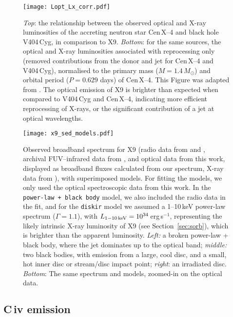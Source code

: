 \documentclass[a4paper,fleqn,usenatbib]{mnras}
\begin{document}
\begin{figure}
	\texttt{[image: Lopt\_Lx\_corr.pdf]}
	\caption{{\it Top}: the relationship between the observed optical and X-ray luminosities of the accreting neutron star Cen\,X--4 and black hole V404\,Cyg, in comparison to X9. {\it Bottom}: for the same sources, the optical and X-ray luminosities associated with reprocessing only (removed contributions from the donor and jet for Cen\,X--4 and V404\,Cyg), normalised to the primary mass ($M = 1.4\,M_\odot$) and orbital period ($P = 0.629$ days) of Cen\,X--4. This Figure was adapted from \citet{2016ApJ...826..149B}. The optical emission of X9 is brighter than expected when compared to V404\,Cyg and Cen\,X--4, indicating more efficient reprocessing of X-rays, or the significant contribution of a jet at optical wavelengths.}
	\label{fig:lxlo_corr}
\end{figure}

\begin{figure*}
	\texttt{[image: x9\_sed\_models.pdf]}
	\caption{Observed broadband spectrum for X9 (radio data from \citealp{2015MNRAS.453.3918M} and \citealp{2017MNRAS.467.2199B}, archival FUV--infrared data from \citealp{2008ApJ...683.1006K}, and optical data from this work, displayed as broadband fluxes calculated from our spectrum, X-ray data from \citealp{2017MNRAS.467.2199B}), with superimposed models. For fitting the models, we only used the optical spectroscopic data from this work. In the {\tt power-law + black body} model, we also included the radio data in the fit, and for the {\tt diskir} model we assumed a 1--10\,keV power-law spectrum ($\Gamma = 1.1$), with $L_{\rm 1-10\,keV} = 10^{34}$\,erg\,s$^{-1}$, representing the likely intrinsic X-ray luminosity of X9 (see Section~\ref{sec:sorb}), which is brighter than the apparent luminosity. {\it Left:} a broken power-law + black body, where the jet dominates up to the optical band; {\it middle:} two black bodies, with emission from a large, cool disc, and a small, hot inner disc or stream/disc impact point; {\it right}: an irradiated disc. {\it Bottom}: The same spectrum and models, zoomed-in on the optical data.}
	\label{fig:x9_wholespec}
\end{figure*}

\subsection{C\,{\sc iv} emission}
\label{sec:civ}
\end{document}
